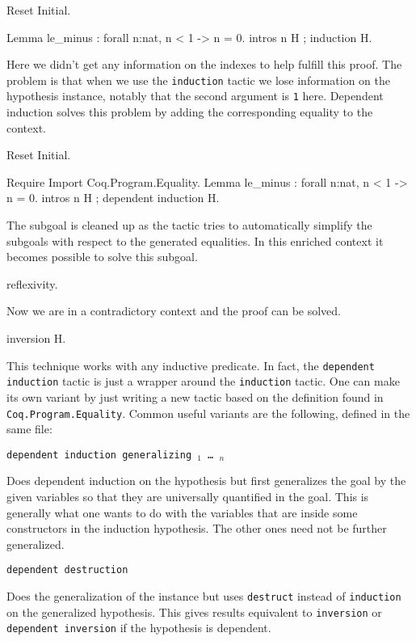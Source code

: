 \begin{coq_eval}
Reset Initial.
\end{coq_eval}
\begin{coq_example}
Lemma le_minus : forall n:nat, n < 1 -> n = 0.
intros n H ; induction H.
\end{coq_example}

Here we didn't get any information on the indexes to help fulfill this
proof. The problem is that when we use the \texttt{induction} tactic
we lose information on the hypothesis instance, notably that the second
argument is \texttt{1} here. Dependent induction solves this problem by
adding the corresponding equality to the context.

\begin{coq_eval}
Reset Initial.
\end{coq_eval}
\begin{coq_example}
Require Import Coq.Program.Equality.
Lemma le_minus : forall n:nat, n < 1 -> n = 0.
intros n H ; dependent induction H.
\end{coq_example}

The subgoal is cleaned up as the tactic tries to automatically
simplify the subgoals with respect to the generated equalities.
In this enriched context it becomes possible to solve this subgoal.
\begin{coq_example}
reflexivity.
\end{coq_example}

Now we are in a contradictory context and the proof can be solved.
\begin{coq_example}
inversion H.
\end{coq_example}

This technique works with any inductive predicate.
In fact, the \texttt{dependent induction} tactic is just a wrapper around
the \texttt{induction} tactic. One can make its own variant by just
writing a new tactic based on the definition found in
\texttt{Coq.Program.Equality}. Common useful variants are the following,
defined in the same file:

\begin{Variants}
\item {\tt dependent induction {\ident} generalizing {\ident$_1$} \dots
    {\ident$_n$}}
  
  Does dependent induction on the hypothesis {\ident} but first
  generalizes the goal by the given variables so that they are
  universally quantified in the goal. This is generally what one wants
  to do with the variables that are inside some constructors in the
  induction hypothesis. The other ones need not be further generalized.

\item {\tt dependent destruction {\ident}}
  
  Does the generalization of the instance {\ident} but uses {\tt destruct}
  instead of {\tt induction} on the generalized hypothesis. This gives
  results equivalent to {\tt inversion} or {\tt dependent inversion} if
  the hypothesis is dependent.
\end{Variants}

